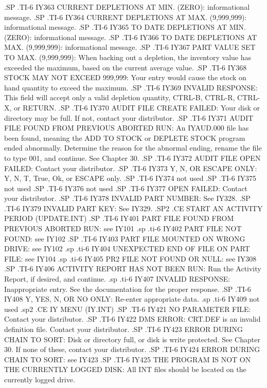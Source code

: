 .SP
.TI-6
IY363 CURRENT DEPLETIONS AT MIN. (ZERO): informational message.
.SP
.TI-6
IY364 CURRENT DEPLETIONS AT MAX. (9,999,999): informational message.
.SP
.TI-6
IY365 TO DATE DEPLETIONS AT MIN. (ZERO): informational message.
.SP
.TI-6
IY366 TO DATE DEPLETIONS AT MAX. (9,999,999): informational message.
.SP
.TI-6
IY367 PART VALUE SET TO MAX. (9,999,999): When backing out a depletion, the
inventory value has exceeded the maximum, based on the current average value.
.SP
.TI-6
IY368 STOCK MAY NOT EXCEED 999,999: Your entry would cause the stock on hand
quantity to exceed the maximum.
.SP
.TI-6
IY369 INVALID RESPONSE: This field will accept only a valid depletion quantity,
CTRL-B, CTRL-R, CTRL-X, or RETURN.
.SP
.TI-6
IY370 AUDIT FILE CREATE FAILED: Your disk or directory may be full.  If not,
contact your distributor.
.SP
.TI-6
IY371 AUDIT FILE FOUND FROM PREVIOUS ABORTED RUN: An IYAUD.000 file has been
found, meaning the ADD TO STOCK  or DEPLETE STOCK program ended abnormally.
Determine the reason for the abnormal ending, rename the file to type 001,
and continue.  See Chapter 30.
.SP
.TI-6
IY372 AUDIT FILE OPEN FAILED: Contact your distributor.
.SP
.TI-6
IY373 Y, N, OR ESCAPE ONLY: Y, N, T, True, Ok, or ESCAPE only.
.SP
.TI-6
IY374 not used
.SP
.TI-6
IY375 not used
.SP
.TI-6
IY376 not used
.SP
.TI-6
IY377 OPEN FAILED: Contact your distributor.
.SP
.TI-6
IY378 INVALID PART NUMBER: See IY328.
.SP
.TI-6
IY379 INVALID PART KEY: See IY329.
.SP2
.CE
START AN ACTIVITY PERIOD (UPDATE.INT)
.SP
.TI-6
IY401 PART FILE FOUND FROM PREVIOUS ABORTED RUN: see IY101
.sp
.ti-6
IY402 PART FILE NOT FOUND: see IY102
.SP
.TI-6
IY403 PART FILE MOUNTED ON WRONG DRIVE: see IY102
.sp
.ti-6
IY404 UNEXPECTED END OF FILE ON PART FILE: see IY104
.sp
.ti-6
IY405 PR2 FILE NOT FOUND OR NULL: see IY308
.SP
.TI-6
IY406 ACTIVITY REPORT HAS NOT BEEN RUN: Run the Activity Report, if desired,
and continue.
.sp
.ti-6
IY407 INVALID RESPONSE: Inappropriate entry.  See the documentation for
the proper response.
.SP
.TI-6
IY408 Y, YES, N, OR NO ONLY: Re-enter appropriate data.
.sp
.ti-6
IY409 not used
.sp2
.CE
IY MENU (IY.INT)
.SP
.TI-6
IY421 NO PARAMETER FILE: Contact your distributor.
.SP
.TI-6
IY422 DMS ERROR: CRT.DEF is an invalid definition file.  Contact your
distributor.
.SP
.TI-6
IY423 ERROR DURING CHAIN TO SORT: Disk or directory full, or disk is write
protected.  See Chapter 30.  If none of these, contact your distributor.
.SP
.TI-6
IY424 ERROR DURING CHAIN TO SORT: see IY423
.SP
.TI-6
IY425 THE PROGRAM IS NOT ON THE CURRENTLY LOGGED DISK: All INT files should
be located on the currently logged drive.
